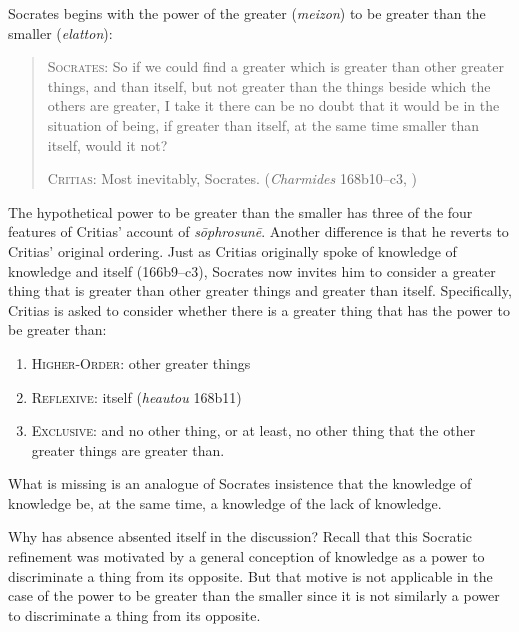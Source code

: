 Socrates begins with the power of the greater (\emph{meizon}) to be greater than the smaller (\emph{elatton}):
\begin{quotation}
	\textsc{Socrates}: So if we could find a greater which is greater than other greater things, and than itself, but not greater than the things beside which the others are greater, I take it there can be no doubt that it would be in the situation of being, if greater than itself, at the same time smaller than itself, would it not?
	
	\textsc{Critias}: Most inevitably, Socrates. (\emph{Charmides} 168b10–c3, \citealt[61]{Lamb:1927qw})
\end{quotation}
The hypothetical power to be greater than the smaller has three of the four features of Critias' account of \emph{sōphrosunē}. Another difference is that he reverts to Critias' original ordering. Just as Critias originally spoke of knowledge of knowledge and itself (166b9–c3), Socrates now invites him to consider a greater thing that is greater than other greater things and greater than itself. Specifically, Critias is asked to consider whether there is a greater thing that has the power to be greater than:
\begin{enumerate}[(1)]
	\item \textsc{Higher-Order}: other greater things
	\item \textsc{Reflexive}: itself (\emph{heautou} 168b11)
	\item \textsc{Exclusive}: and no other thing, or at least, no other thing that the other greater things are greater than.
\end{enumerate}
What is missing is an analogue of Socrates insistence that the knowledge of knowledge be, at the same time, a knowledge of the lack of knowledge. 

Why has absence absented itself in the discussion? Recall that this Socratic refinement was motivated by a general conception of knowledge as a power to discriminate a thing from its opposite. But that motive is not applicable in the case of the power to be greater than the smaller since it is not similarly a power to discriminate a thing from its opposite.

